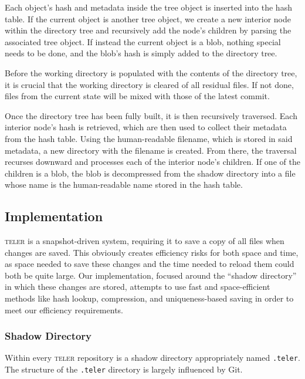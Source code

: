 \documentclass[11pt, letterpaper]{article}
\begin{document}
\begin{multicols}{2}
  Each object's hash and metadata inside the tree object is inserted
  into the hash table. If the current object is another tree object, we
  create a new interior node within the directory tree and recursively
  add the node's children by parsing the associated tree object. If
  instead the current object is a blob, nothing special needs to
  be done, and the blob's hash is simply added to the directory tree.

  Before the working directory is populated with the contents of the
  directory tree, it is crucial that the working directory is cleared
  of all residual files. If not done, files from the current state
  will be mixed with those of the latest commit.

  Once the directory tree has been fully built, it is then recursively
  traversed. Each interior node's hash is retrieved, which are
  then used to collect their metadata from the hash table. Using the
  human-readable filename, which is stored in said metadata, a new
  directory with the filename is created. From there, the traversal
  recurses downward and processes each of the interior node's
  children. If one of the children is a blob, the blob is decompressed
  from the shadow directory into a file whose name is the
  human-readable name stored in the hash table.

  \subsection{Implementation}
  \label{sec:implementation}
  \textsc{teler} is a snapshot-driven system, requiring it to save a copy of all
  files when changes are saved. This obviously creates efficiency risks for both
  space and time, as space needed to save these changes and the time needed to
  reload them could both be quite large. Our implementation, focused around the
  ``shadow directory'' in which these changes are stored, attempts to use
  fast and space-efficient methods like hash lookup, compression, and
  uniqueness-based saving in order to meet our efficiency requirements.

  \subsubsection{Shadow Directory}
  \label{subsubsec:shadowdir}
  Within every \textsc{teler} repository is a shadow directory
  appropriately named \texttt{.teler}. The structure of the
  \texttt{.teler} directory is largely influenced by Git.


\end{multicols}
\end{document}
